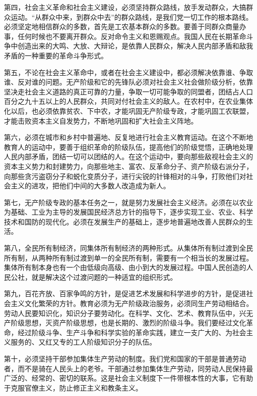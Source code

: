 第四，社会主义革命和社会主义建设，必须坚持群众路线，放手发动群众，大搞群众运动。“从群众中来，到群众中去”的群众路线，是我们党一切工作的根本路线。必须坚定地相信群众的多数，首先是工农基本群众的多数。要善于同群众商量办事，任何时候也不要离开群众。反对命令主义和恩赐观点。我国人民在长期革命斗争中创造出来的大鸣、大放、大辩论，是依靠人民群众，解决人民内部矛盾和敌我矛盾的一种重要的革命斗争形式。

第五，不论在社会主义革命中，或者在社会主义建设中，都必须解决依靠谁、争取谁、反对谁的问题。无产阶级和它的先锋队必须对社会主义社会做阶级分析，依靠坚决走社会主义道路的真正可靠的力量，争取一切可能争取的同盟者，团结占人口百分之九十五以上的人民群众，共同对付社会主义的敌人。在农村中，在农业集体化以后，也必须依靠贫农、下中农，才能巩固无产阶级专政，才能巩固工农联盟，才能击败资本主义自发势力，不断地巩固和扩大社会主义阵地。

第六，必须在城市和乡村中普遍地、反复地进行社会主义教育运动。在这个不断地教育人的运动中，要善于组织革命的阶级队伍，提高他们的阶级觉悟，正确地处理人民内部矛盾，团结一切可以团结的人。在这个运动中，要向那些敌视社会主义的资本主义势力和封建势力，向那些地主、富农、反革命分子、资产阶级右派分子，向那些贪污盗窃分子和蜕化变质分子，进行尖锐的针锋相对的斗争，打败他们对社会主义的进攻，把他们中间的大多数人改造成为新人。

第七，无产阶级专政的基本任务之一，就是努力发展社会主义经济。必须在以农业为基础、工业为主导的发展国民经济总方针的指导下，逐步实现工业、农业、科学技术和国防的现代化。必须在发展生产的基础上，逐步地普遍地改善人民群众的生活。

第八，全民所有制经济，同集体所有制经济的两种形式。从集体所有制过渡到全民所有制，从两种所有制过渡到单一的全民所有制，需要有一个相当长的发展过程。集体所有制本身也有一个由低级向高级、由小到大的发展过程。中国人民创造的人民公社，就是解决这个过渡问题的一种适宜的组织形式。

第九，百花齐放、百家争鸣的方针，是促进艺术发展和科学进步的方针，是促进社会主义文化繁荣的方针。教育必须为无产阶级政治服务，必须同生产劳动相结合。劳动人民要知识化，知识分子要劳动化。在科学、文化、艺术、教育队伍中，兴无产阶级思想，灭资产阶级思想，也是长期的、激烈的阶级斗争。我们要经过文化革命，经过阶级斗争、生产斗争和科学实验的革命实践，建立一支广大的、为社会主义服务的、又红又专的工人阶级知识分子的队伍。

第十，必须坚持干部参加集体生产劳动的制度。我们党和国家的干部是普通劳动者，而不是骑在人民头上的老爷。干部通过参加集体生产劳动，同劳动人民保持最广泛的、经常的、密切的联系。这是社会主义制度下一件带根本性的大事，它有助于克服官僚主义，防止修正主义和教条主义。

